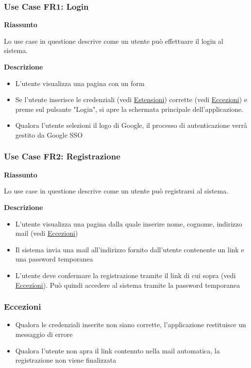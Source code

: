 \documentclass[9pt]{extarticle}
\begin{document}
\subsubsection*{Use Case FR1: Login}

\textbf{Riassunto}

Lo use case in questione descrive come un utente può effettuare il login al sistema.

\textbf{Descrizione}

\begin{itemize}
	\item L'utente visualizza una pagina con un form
	\item Se l'utente inserisce le credenziali (vedi  \hyperref[Estensioni-FR2]{Estensioni}) corrette (vedi \hyperref[Eccezioni-FR2]{Eccezioni}) e preme sul pulsante "Login", si apre la schermata principale dell'applicazione.
	\item Qualora l'utente selezioni il logo di Google, il processo di autenticazione verrà gestito da Google SSO
\end{itemize}

\subsubsection*{Use Case FR2: Registrazione}

\textbf{Riassunto}

Lo use case in questione descrive come un utente può registrarsi al sistema.

\textbf{Descrizione}

\begin{itemize}
	\item L'utente visualizza una pagina dalla quale inserire nome, cognome, indirizzo mail (vedi \hyperref[Eccezioni-FR2]{Eccezioni})
	\item Il sistema invia una mail all'indirizzo fornito dall'utente contenente un link e una password temporanea
	\item L'utente deve confermare la registrazione tramite il link di cui sopra (vedi \hyperref[Eccezioni-FR2]{Eccezioni}). Può quindi accedere al sistema tramite la password temporanea
\end{itemize}


\subsubsection*{Eccezioni}\label{Eccezioni-FR2}

\begin{itemize}
	\item Qualora le credenziali inserite non siano corrette, l'applicazione restituisce un messaggio di errore
	\item Qualora l'utente non apra il link contenuto nella mail automatica, la registrazione non viene finalizzata
\end{itemize}
\end{document}
